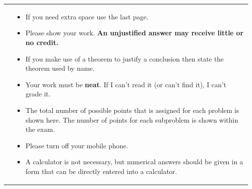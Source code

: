 \documentclass[9pt,addpoints]{exam}
\begin{document}
\newenvironment{nagging}%
  {\begin{itemize}%
    \setlength{\itemsep}{6pt}%
    \setlength{\parskip}{0pt}}%
  {\end{itemize}}

\vfill

\begin{tabular}{p{8cm}m{8cm}}
  \gradetable[v][questions]
  &
    \begin{nagging}
    \item If you need extra space use the last page.

    \item Please show your work. \textbf{An unjustified answer may receive
        little or no credit.}

    \item If you make use of a theorem to justify a conclusion then
      state the theorem used by name.

    \item Your work must be {\bf neat}. If I can't read it (or can't
      find it), I can't grade it.

    \item The total number of possible points that is assigned for
      each problem is shown here.  The number of points for each
      subproblem is shown within the exam.

    \item Please turn off your mobile phone.


    \item A calculator is not necessary, but numerical answers should
      be given in a form that can be directly entered into a
      calculator.
    \end{nagging}
\end{tabular}

\vfill





\clearpage 


\end{document}
